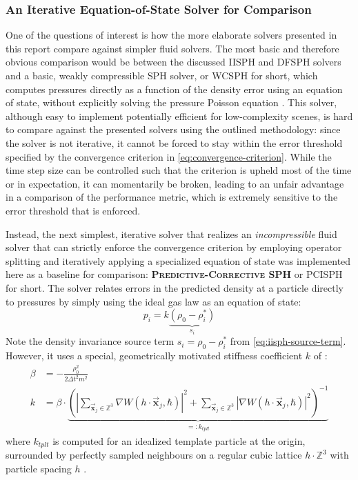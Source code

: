 \documentclass[oneside, a4paper]{book}
\newcommand\emphasis[1]{{\scshape\bfseries#1}}
\newcommand\abs[1]{\left|#1\right|}
\newcommand\vek[1]{\vec{\bm{#1}}}
\newcommand\br[1]{\left(#1\right)}
\begin{document}
  \subsubsection{An Iterative Equation-of-State Solver for Comparison}
  One of the questions of interest is how the more elaborate solvers presented in this report compare against simpler fluid solvers. The most basic and therefore obvious comparison would be between the discussed IISPH and DFSPH solvers and a basic, weakly compressible SPH solver, or WCSPH for short, which computes pressures directly as a function of the density error using an equation of state, without explicitly solving the pressure Poisson equation \autocite{wcsph}. This solver, although easy to implement potentially efficient for low-complexity scenes, is hard to compare against the presented solvers using the outlined methodology: since the solver is not iterative, it cannot be forced to stay within the error threshold specified by the convergence criterion in \autoref{eq:convergence-criterion}. While the time step size can be controlled such that the criterion is upheld most of the time or in expectation, it can momentarily be broken, leading to an unfair advantage in a comparison of the performance metric, which is extremely sensitive to the error threshold that is enforced. 
  
  Instead, the next simplest, iterative solver that realizes an \textit{incompressible} fluid solver that can strictly enforce the convergence criterion by employing operator splitting and iteratively applying a specialized equation of state was implemented here as a baseline for comparison: \emphasis{Predictive-Corrective SPH} or PCISPH for short. The solver relates errors in the predicted density at a particle directly to pressures by simply using the ideal gas law as an equation of state:
  \begin{equation}\label{eq:pcisph-eos}
    p_i = k \underbrace{\br{\rho_0-\rho_i^*}}_{s_i}
  \end{equation}
  Note the density invariance source term $s_i = \rho_0-\rho_i^*$ from \autoref{eq:iisph-source-term}. However, it uses a special, geometrically motivated stiffness coefficient $k$ of \autocite{pcisph}:
  \begin{align}
    \beta &= -\frac{\rho_0^2}{2\Delta t^2 m^2}\\
    k &= \beta \cdot \underbrace{{\br{\abs{\sum_{\vek{x}_j \in \mathds{Z}^3} \nabla W\br{h\cdot \vek{x}_j, \hbar}}^2 +\sum_{\vek{x}_j \in \mathds{Z}^3} \abs{\nabla W\br{h\cdot \vek{x}_j, \hbar}}^2}}^{-1}}_{=: k_{tplt}}\label{eq:pcisph-stiffness}
  \end{align}
  where $k_{tplt}$ is computed for an idealized template particle at the origin, surrounded by perfectly sampled neighbours on a regular cubic lattice $h\cdot \mathds{Z}^3$ with particle spacing $h$ \autocite{pcisph}. 
  
\end{document}
